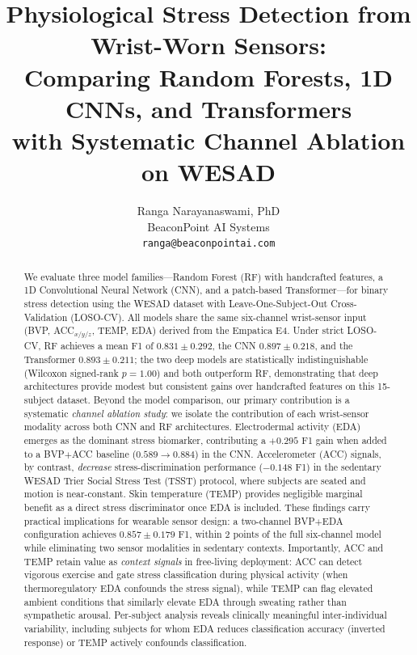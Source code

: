 \documentclass[10pt,twocolumn]{article}
\title{\textbf{Physiological Stress Detection from Wrist-Worn Sensors:\\
Comparing Random Forests, 1D CNNs, and Transformers\\
with Systematic Channel Ablation on WESAD}}
\author{
  Ranga Narayanaswami, PhD\\
  BeaconPoint AI Systems\\
  \texttt{ranga@beaconpointai.com}
}
\date{}
\begin{document}
\maketitle

\begin{abstract}
We evaluate three model families---Random Forest (RF) with handcrafted features,
a 1D Convolutional Neural Network (CNN), and a patch-based Transformer---for
binary stress detection using the WESAD dataset with
Leave-One-Subject-Out Cross-Validation (LOSO-CV).
All models share the same six-channel wrist-sensor input
(BVP, ACC$_{x/y/z}$, TEMP, EDA) derived from the Empatica E4.
Under strict LOSO-CV, RF achieves a mean F1 of $0.831 \pm 0.292$,
the CNN $0.897 \pm 0.218$, and the Transformer $0.893 \pm 0.211$;
the two deep models are statistically indistinguishable (Wilcoxon
signed-rank $p=1.00$) and both outperform RF, demonstrating that deep
architectures provide modest but consistent gains over handcrafted
features on this 15-subject dataset.
Beyond the model comparison, our primary contribution is a systematic
\emph{channel ablation study}: we isolate the contribution of each
wrist-sensor modality across both CNN and RF architectures.
Electrodermal activity (EDA) emerges as the dominant stress biomarker,
contributing a $+0.295$ F1 gain when added to a BVP$+$ACC baseline
($0.589 \to 0.884$) in the CNN.
Accelerometer (ACC) signals, by contrast, \emph{decrease} stress-discrimination
performance ($-0.148$ F1) in the sedentary WESAD Trier Social Stress Test (TSST)
protocol, where subjects are seated and motion is near-constant.
Skin temperature (TEMP) provides negligible marginal benefit as a direct
stress discriminator once EDA is included.
These findings carry practical implications for wearable sensor design:
a two-channel BVP$+$EDA configuration achieves $0.857 \pm 0.179$ F1,
within 2 points of the full six-channel model while eliminating two sensor
modalities in sedentary contexts.
Importantly, ACC and TEMP retain value as \emph{context signals} in
free-living deployment: ACC can detect vigorous exercise and gate stress
classification during physical activity (when thermoregulatory EDA
confounds the stress signal), while TEMP can flag elevated ambient conditions
that similarly elevate EDA through sweating rather than sympathetic arousal.
Per-subject analysis reveals clinically meaningful inter-individual
variability, including subjects for whom EDA reduces classification accuracy (inverted response)
or TEMP actively confounds classification.
\end{abstract}
\end{document}

